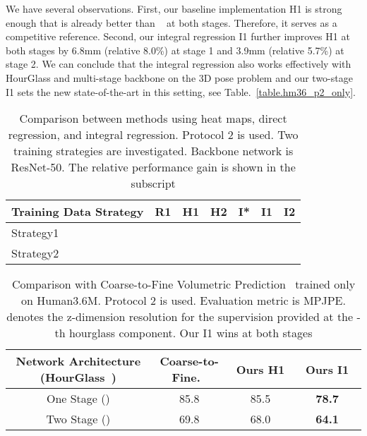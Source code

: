 \documentclass[runningheads]{llncs}
\begin{document}
We have several observations. First, our baseline implementation H1 is strong enough that is already better than ~\cite{pavlakos2016coarse} at both stages. Therefore, it serves as a competitive reference. Second, our integral regression I1 further improves H1 at both stages by 6.8mm (relative 8.0\%) at stage 1 and 3.9mm (relative 5.7\%) at stage 2. We can conclude that the integral regression also works effectively with HourGlass and multi-stage backbone on the 3D pose problem and our two-stage I1 sets the new state-of-the-art in this setting, see Table.~\ref{table.hm36_p2_only}.

\begin{table}[t]
\caption{Comparison between methods using heat maps, direct regression, and integral regression. Protocol 2 is used. Two training strategies are investigated. Backbone network is ResNet-50. The relative performance gain is shown in the subscript}
\begin{center}

\begin{tabular}{l | l | l | l | l | l | l }
\hline
Training Data Strategy & R1 & H1 & H2  & I* & I1 & I2\\
\hline
Strategy1  &  &  &  &  &  & \\ 
\hline
Strategy2  &  &  &  &  &  & \\ 
\hline
\end{tabular}
\end{center}
\label{table.exp_head_structure_hm36_mpii}
\end{table}


\begin{table}[t]
\caption{Comparison with Coarse-to-Fine Volumetric Prediction~\cite{pavlakos2016coarse} trained only on Human3.6M. Protocol 2 is used. Evaluation metric is MPJPE.  denotes the z-dimension resolution for the supervision
provided at the -th hourglass component. Our I1 wins at both stages}
\begin{center}
\begin{tabular}{|c|c|c|c|}
\hline
 Network Architecture (HourGlass~\cite{newell2016stacked}) & Coarse-to-Fine.~\cite{pavlakos2016coarse}& Ours H1&Ours I1  \\
 \hline
 One Stage () & 85.8  & ~~~85.5~~~ & ~~~\textbf{78.7}~~~ \\
\hline
 Two Stage () & 69.8 & 68.0 & \textbf{64.1} \\
\hline
\end{tabular}
\end{center}
\label{table.exp_hm36_two_stage}
\end{table}
\end{document}
